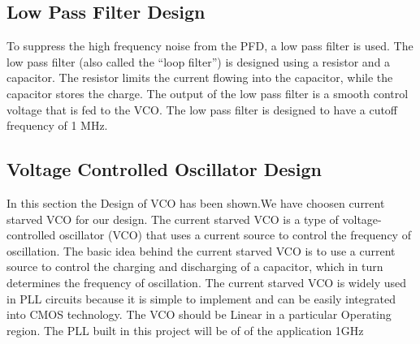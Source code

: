 
\subsection{Low Pass Filter Design}
To suppress the high frequency noise from the PFD, a low pass filter is used. The low pass filter (also called the “loop ﬁlter”) is designed using a resistor and a capacitor. The resistor limits the current flowing into the capacitor, while the capacitor stores the charge. The output of the low pass filter is a smooth control voltage that is fed to the VCO. The low pass filter is designed to have a cutoff frequency of 1 MHz.
\subsection{Voltage Controlled Oscillator Design}
In this section the Design of VCO has been shown.We have choosen current starved VCO for our design. The current starved VCO is a type of voltage-controlled oscillator (VCO) that uses a current source to control the frequency of oscillation. The basic idea behind the current starved VCO is to use a current source to control the charging and discharging of a capacitor, which in turn determines the frequency of oscillation. The current starved VCO is widely used in PLL circuits because it is simple to implement and can be easily integrated into CMOS technology.
The VCO should be Linear in a particular Operating region. The PLL built in this project will be of of the application 1GHz


